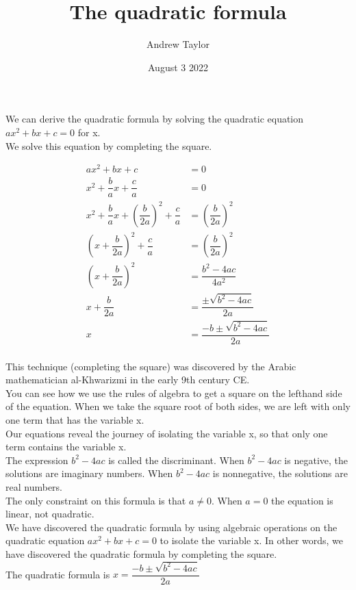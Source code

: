 \documentclass{article}
\title{The quadratic formula}
\author{Andrew Taylor}
\date{August 3 2022}
\begin{document}
\maketitle

We can derive the quadratic formula by solving the quadratic equation $ax^2 + bx + c = 0$ for x. \\

We solve this equation by completing the square.

\begin{align*}
ax^2 + bx + c &= 0 \\
x^2 + \dfrac{b}{a}x + \dfrac{c}{a} &= 0 \\
x^2 + \dfrac{b}{a}x + \left(\dfrac{b}{2a}\right)^2 + \dfrac{c}{a} &= \left(\dfrac{b}{2a}\right)^2 \\
\left(x + \dfrac{b}{2a}\right)^2 + \dfrac{c}{a} &= \left(\dfrac{b}{2a}\right)^2 \\
\left(x + \dfrac{b}{2a}\right)^2 &= \dfrac{b^2 - 4ac}{4a^2} \\
x + \dfrac{b}{2a} &= \dfrac{\pm \sqrt{b^2 - 4ac}}{2a} \\
x &= \dfrac{-b \pm \sqrt{b^2 - 4ac}}{2a} \\
\end{align*}

This technique (completing the square) was discovered by the Arabic mathematician al-Khwarizmi in the early 9th century CE. \\

You can see how we use the rules of algebra to get a square on the lefthand side of the equation. When we take the square root of both sides, we are left with only one term that has the variable x. \\

Our equations reveal the journey of isolating the variable x, so that only one term contains the variable x. \\

The expression $b^2 - 4ac$ is called the discriminant. When $b^2 - 4ac$ is negative, the solutions are imaginary numbers. When $b^2 - 4ac$ is nonnegative, the solutions are real numbers. \\

The only constraint on this formula is that $a \neq 0$. When $a = 0$ the equation is linear, not quadratic. \\

We have discovered the quadratic formula by using algebraic operations on the quadratic equation $ax^2 + bx + c = 0$ to isolate the variable x. In other words, we have discovered the quadratic formula by completing the square. \\

The quadratic formula is $x = \dfrac{-b \pm \sqrt{b^2 - 4ac}}{2a}$
\end{document}

